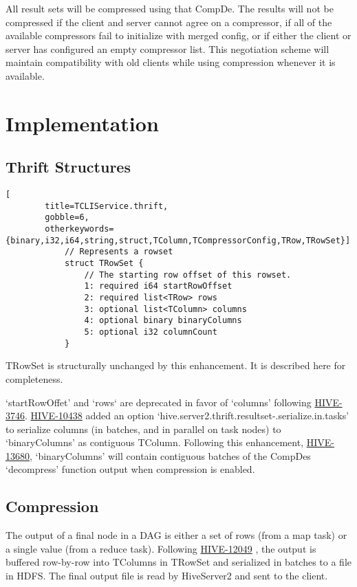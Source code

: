 \documentclass[11pt,a4paper]{article}
\begin{document}
		All result sets will be compressed using that CompDe.
		The results will not be compressed if the client and server cannot agree on a compressor, if all of the available compressors fail to initialize with merged config, or if either the client or server has configured an empty compressor list.
		This negotiation scheme will maintain compatibility with old clients while using compression whenever it is available.
		
\section{Implementation}
	
	\subsection{Thrift Structures}
		
		\begin{lstlisting}[
		title=TCLIService.thrift,
		gobble=6,
		otherkeywords={binary,i32,i64,string,struct,TColumn,TCompressorConfig,TRow,TRowSet}]
			// Represents a rowset
			struct TRowSet {
				// The starting row offset of this rowset.
				1: required i64 startRowOffset
				2: required list<TRow> rows
				3: optional list<TColumn> columns
				4: optional binary binaryColumns
				5: optional i32 columnCount
			}
		\end{lstlisting}
		
		TRowSet is structurally unchanged by this enhancement. It is described here for completeness.
		
		`startRowOffet' and `rows` are deprecated in favor of `columns' following \href{https://issues.apache.org/jira/browse/HIVE-3746}{HIVE-3746}.
		\href{https://issues.apache.org/jira/browse/HIVE-10438}{HIVE-10438}
		added an option `hive.server2.thrift.resultset-.serialize.in.tasks' to serialize columns (in batches, and in parallel on task nodes) to `binaryColumns' as contiguous TColumn. Following this enhancement, 
		\href{https://issues.apache.org/jira/browse/HIVE-13680}{HIVE-13680},
		`binaryColumns' will contain contiguous batches of the CompDes `decompress' function output when compression is enabled.
		
	\subsection{Compression}
	
		The output of a final node in a DAG is either a set of rows (from a map task) or a single value (from a reduce task).
		Following
		\href{https://issues.apache.org/jira/browse/HIVE-12049}{HIVE-12049}
		, the output is buffered row-by-row into TColumns in TRowSet and serialized in batches to a file in HDFS.
		The final output file is read by HiveServer2 and sent to the client.
		
\end{document}
